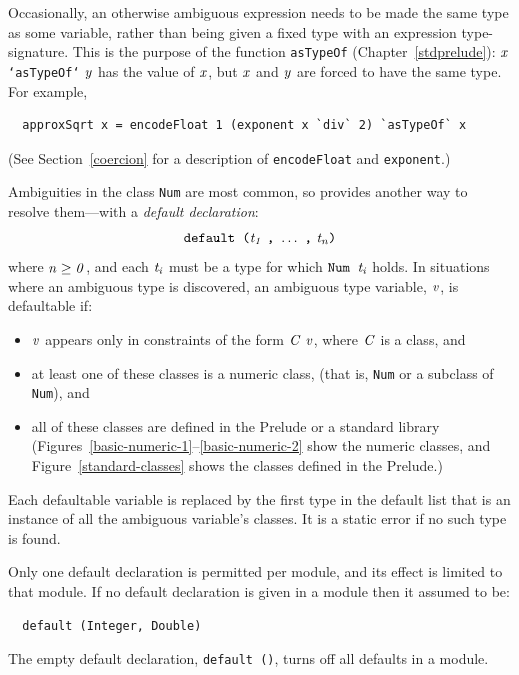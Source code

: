 Occasionally, an otherwise ambiguous expression needs to be made
the same type as some variable, rather than being given a fixed
type with an expression type-signature.  This is the purpose
of the function \mbox{\tt asTypeOf} (Chapter~\ref{stdprelude}):
\mbox{$\it x$} \mbox{\tt `asTypeOf`} \mbox{$\it y$} has the value of \mbox{$\it x$}, but \mbox{$\it x$} and \mbox{$\it y$} are
forced to have the same type.  For example,
\bprog
{\small\begin{verbatim}
  approxSqrt x = encodeFloat 1 (exponent x `div` 2) `asTypeOf` x
\end{verbatim}}
\eprog
(See Section~\ref{coercion} for a description of \mbox{\tt encodeFloat} and \mbox{\tt exponent}.)

Ambiguities in the class \mbox{\tt Num}
are most common, so \Haskell{}
provides another way to resolve them---with a {\em
default declaration}:
\[
\mbox{$\it \makebox{\tt default\ (}t_1\ \makebox{\tt ,}\ \ldots \ \makebox{\tt ,}\ t_n\makebox{\tt )}$}
\]
where \mbox{$\it n\geq0$}, and each
\mbox{$\it t_i$} must be a type for which \mbox{$\it \makebox{\tt Num\ }t_i$} holds.
In situations where an ambiguous type is discovered, an ambiguous type variable, \mbox{$\it v$}, 
is defaultable if:
\begin{itemize}
\item \mbox{$\it v$} appears only in constraints of the form \mbox{$\it C\ v$}, where \mbox{$\it C$} is a class, and
\item at least one of these classes is a numeric class,
        (that is, \mbox{\tt Num} or a subclass of \mbox{\tt Num}), and 
\item all of these classes are defined in the Prelude or a standard library
(Figures~\ref{basic-numeric-1}--\ref{basic-numeric-2}
show the numeric classes, and
Figure~\ref{standard-classes}
shows the classes defined in the Prelude.)
\end{itemize}
Each defaultable variable is replaced by the first type in the
default list that is an instance of all the ambiguous variable's classes.
It is a static error if no such type is found.

Only one default declaration is permitted per module, and its effect
is limited to that module.  If no default declaration is given in a
module then it assumed to be:
\bprog
{\small\begin{verbatim}
  default (Integer, Double)
\end{verbatim}}
\eprog
The empty default declaration, \mbox{\tt default\ ()}, turns off all defaults in a module.

